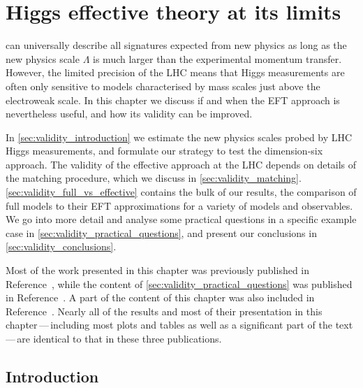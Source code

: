 



\chapter{Higgs effective theory at its limits}
\label{chapter:validity}

 can universally
describe all signatures expected from new physics as long as the new
physics scale $\Lambda$ is much larger than the experimental momentum
transfer. However, the limited precision of the LHC means that Higgs
measurements are often only sensitive to models characterised by mass
scales just above the electroweak scale. In this chapter we discuss if
and when the EFT approach is nevertheless useful, and how its validity
can be improved.

In \autoref{sec:validity_introduction} we estimate the new physics
scales probed by LHC Higgs measurements, and formulate our strategy to
test the dimension-six approach. The validity of the effective
approach at the LHC depends on details of the matching procedure,
which we discuss in
\autoref{sec:validity_matching}. \autoref{sec:validity_full_vs_effective}
contains the bulk of our results, the comparison of full models to
their EFT approximations for a variety of models and observables. We
go into more detail and analyse some practical questions in a specific
example case in \autoref{sec:validity_practical_questions}, and
present our conclusions in \autoref{sec:validity_conclusions}.

Most of the work presented in this chapter was previously published in
Reference~\cite{Brehmer:2015rna}, while the content of
\autoref{sec:validity_practical_questions} was published in
Reference~\cite{Biekotter:2016ecg}. A part of the content of this
chapter was also included in
Reference~\cite{deFlorian:2016spz}. Nearly all of the results and most
of their presentation in this chapter\,---\,including most plots and
tables as well as a significant part of the text\,---\,are identical
to that in these three publications.



\section{Introduction}
\label{sec:validity_introduction}

